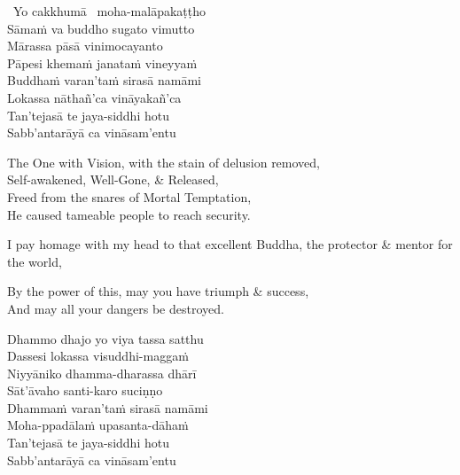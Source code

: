 \begin{pali-hangtogether}
  \anglebracketleft\ \hspace{-0.5mm}Yo cakkhumā \hspace{-0.5mm}\anglebracketright\  moha-malāpakaṭṭho\\
  Sāmaṁ va buddho sugato vimutto\\
  Mārassa pāsā vinimocayanto\\
  Pāpesi khemaṁ janataṁ vineyyaṁ\\
  Buddhaṁ varan'taṁ sirasā namāmi\\
  Lokassa nāthañ'ca vināyakañ'ca\\
  Tan'tejasā te jaya-siddhi hotu\\
  Sabb'antarāyā ca vināsam'entu
\end{pali-hangtogether}

\begin{english-verses}
  The One with Vision, with the stain of delusion removed,\\
  Self-awakened, Well-Gone, \& Released,\\
  Freed from the snares of Mortal Temptation,\\
  He caused tameable people to reach security.\\
  \begin{english-hangtogether-verses}
    I pay homage with my head to that excellent Buddha, the protector \& mentor for the world,\\
  \end{english-hangtogether-verses}
  By the power of this, may you have triumph \& success,\\
  And may all your dangers be destroyed.
\end{english-verses}

\begin{pali-hang-continued}
  Dhammo dhajo yo viya tassa satthu\\
  Dassesi lokassa visuddhi-maggaṁ\\
  Niyyāniko dhamma-dharassa dhārī\\
  Sāt'āvaho santi-karo suciṇṇo\\
  Dhammaṁ varan'taṁ sirasā namāmi\\
  Moha-ppadālaṁ upasanta-dāhaṁ\\
  Tan'tejasā te jaya-siddhi hotu\\
  Sabb'antarāyā ca vināsam'entu
\end{pali-hang-continued}

